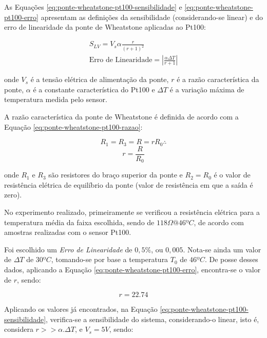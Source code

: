 \documentclass[a4paper]{instrumentacao}
\begin{document}
As Equações \ref{eq:ponte-wheatstone-pt100-sensibilidade} e \ref{eq:ponte-wheatstone-pt100-erro} apresentam as definições da sensibilidade (considerando-se linear) e do erro de linearidade da ponte de Wheatstone aplicadas ao Pt100:


\begin{eqnarray}
	S_{LV} = V_s \alpha \frac{r}{(r+1)^2}	 \label{eq:ponte-wheatstone-pt100-sensibilidade} \\
	\text{Erro de Linearidade} = \left|\frac{\alpha \Delta T}{r+1}\right|			   \label{eq:ponte-wheatstone-pt100-erro}
\end{eqnarray}

\noindent onde $V_s$ é a tensão elétrica de alimentação da ponte, $r$ é a razão característica da ponte, $\alpha$ é a constante característica do Pt100 e $\Delta T$ é a variação máxima de temperatura medida pelo sensor.

A razão característica da ponte de Wheatstone é definida de acordo com a Equação \ref{eq:ponte-wheatstone-pt100-razao}:

\begin{equation*}
	R_1 = R_3 = R = r R_0   \therefore
\end{equation*}
\begin{equation}
	r = \frac{R}{R_0}
	\label{eq:ponte-wheatstone-pt100-razao}
\end{equation}

\noindent onde $R_1$ e $R_3$ são resistores do braço superior da ponte e $R_2=R_0$ é o valor de resistência elétrica de equilíbrio da ponte (valor de resistência em que a saída é zero).


No experimento realizado, primeiramente se verificou a resistência elétrica para a temperatura média da faixa escolhida, sendo de $118 \Omega @ 46ºC$, de acordo com amostras realizadas com o sensor Pt100.

Foi escolhido um \textit{Erro de Linearidade} de $0,5\%$, ou $0,005$. Nota-se ainda um valor de $\Delta T$ de $30ºC$, tomando-se por base a temperatura $T_0$ de $46ºC$. De posse desses dados, aplicando a Equação \ref{eq:ponte-wheatstone-pt100-erro}, encontra-se o valor de $r$, sendo:

\begin{equation}
	r = 22.74
	\label{eq:ponte-wheatstone-pt100-erro-valor}
\end{equation} 

Aplicando os valores já encontrados, na Equação \ref{eq:ponte-wheatstone-pt100-sensibilidade}, verifica-se a sensibilidade do sistema, considerando-o linear, isto é, considera $r >> \alpha.\Delta T$, e $V_s=5V$, sendo:
\end{document}
